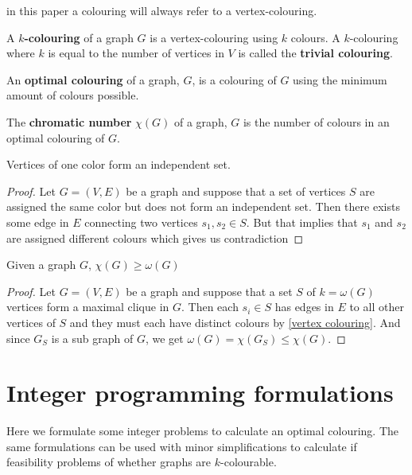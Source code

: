 in this paper a colouring will always refer to a vertex-colouring.
\begin{definition}
A \textbf{$k$-colouring} of a graph $G$ is a vertex-colouring using $k$ colours. A $k$-colouring where $k$ is equal to the number of vertices in $V$ is called the \textbf{trivial colouring}.
\end{definition}
\begin{definition}\label{cromatic number}
An \textbf{optimal colouring} of a graph, $G$, is a colouring of $G$ using the minimum amount of colours possible.
\end{definition}
\begin{definition}\label{cromatic number}
The \textbf{chromatic number} $\chi (G)$ of a graph, $G$ is the number of colours in an optimal colouring of $G$.
\end{definition}
\begin{theorem}
Vertices of one color form an independent set.
\begin{proof}
Let $G=(V,E)$ be a graph and suppose that a set of vertices $S$ are assigned the same color but does not form an independent set. Then there exists some edge in $E$ connecting two vertices $s_1,s_2 \in S$. But that implies that $s_1$ and $s_2$ are assigned different colours which gives us contradiction
\end{proof}
\end{theorem}
\begin{theorem}
Given a graph $G$, $\chi (G) \geq \omega(G)$
\begin{proof}
Let $G=(V,E)$ be a graph and suppose that a set $S$ of $k = \omega(G)$ vertices form a maximal clique in $G$. Then each $s_i \in S$ has edges in $E$ to all other vertices of $S$ and they must each have distinct colours by \ref{vertex colouring}. And since $G_S$ is a sub graph of $G$, we get $\omega(G)= \chi(G_S) \leq \chi(G)$.
\end{proof}
\end{theorem}
\section{Integer programming formulations}
Here we formulate some integer problems to calculate an optimal colouring. The same formulations can be used with minor simplifications to calculate if feasibility problems of whether graphs are $k$-colourable.\\
